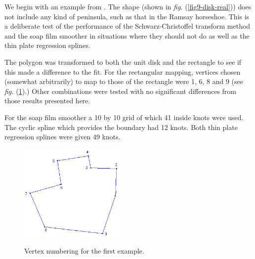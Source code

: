 \documentclass[a4paper,10pt]{amsart}
\newcommand{\sch}{Schwarz-Christoffel }
\newcommand{\fig}[1]{\emph{fig.} (\ref{#1})}
\begin{document}
We begin with an example from \cite{miller09}. The shape (shown in \fig{fig9-disk-real}) does not include any kind of peninsula, such as that in the Ramsay horseshoe. This is a deliberate test of the performance of the \sch transform method and the soap film smoother in situations where they should not do as well as the thin plate regression splines. 

The polygon was transformed to both the unit disk and the rectangle to see if this made a difference to the fit. For the rectangular mapping, vertices chosen (somewhat arbitrarily) to map to those of the rectangle were 1, 6, 8 and 9 (see \fig{fig9-numbered}.) Other combinations were tested with no significant differences from those results presented here.

For the soap film smoother a 10 by 10 grid of which 41 inside knots were used. The cyclic spline which provides the boundary had 12 knots. Both thin plate regression splines were given 49 knots.

\begin{figure}[tbp]
\centering
\includegraphics[width=2in]{figs-otherdomains/fig9-numbered.png} \\
\caption{Vertex numbering for the first example.}
\label{fig9-numbered}
\end{figure}
\end{document}
